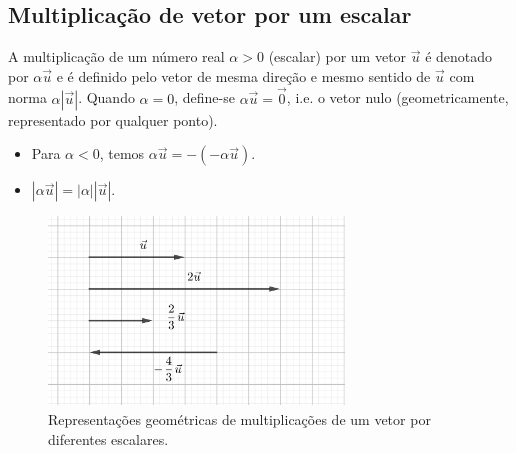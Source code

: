 \subsection{Multiplicação de vetor por um escalar}

A multiplicação de um número real $\alpha>0$ (escalar) por um vetor $\vec{u}$ é denotado por $\alpha\vec{u}$ e é definido pelo vetor de mesma direção e mesmo sentido de $\vec{u}$ com norma $\alpha|\vec{u}|$. Quando $\alpha = 0$, define-se $\alpha\vec{u}=\vec{0}$, i.e. o vetor nulo (geometricamente, representado por qualquer ponto).

\begin{obs}
  \begin{itemize}
  \item Para $\alpha<0$, temos $\alpha\vec{u} = -(-\alpha\vec{u})$.
  \item $|\alpha\vec{u}|=|\alpha||\vec{u}|$.
\end{itemize}
\end{obs}

\begin{figure}[h!]
  \centering
  \includegraphics[width=0.7\textwidth]{./cap_vetor/dados/fig_vescalar/fig_vescalar}
  \caption{Representações geométricas de multiplicações de um vetor por diferentes escalares.}
  \label{fig:vescalar}
\end{figure}


